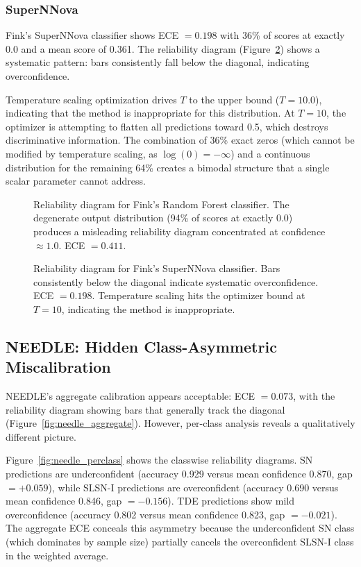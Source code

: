\documentclass[twocolumn]{aastex631}
\begin{document}
\subsubsection{SuperNNova}

Fink's SuperNNova classifier \citep{moller2020} shows ECE $= 0.198$ with 36\% of scores at exactly 0.0 and a mean score of 0.361. The reliability diagram (Figure~\ref{fig:fink_snn}) shows a systematic pattern: bars consistently fall below the diagonal, indicating overconfidence.

Temperature scaling optimization drives $T$ to the upper bound ($T = 10.0$), indicating that the method is inappropriate for this distribution. At $T = 10$, the optimizer is attempting to flatten all predictions toward 0.5, which destroys discriminative information. The combination of 36\% exact zeros (which cannot be modified by temperature scaling, as $\log(0) = -\infty$) and a continuous distribution for the remaining 64\% creates a bimodal structure that a single scalar parameter cannot address.

\begin{figure}
\caption{Reliability diagram for Fink's Random Forest classifier. The degenerate output distribution (94\% of scores at exactly 0.0) produces a misleading reliability diagram concentrated at confidence $\approx 1.0$. ECE $= 0.411$. \label{fig:fink_rf}}
\end{figure}

\begin{figure}
\caption{Reliability diagram for Fink's SuperNNova classifier. Bars consistently below the diagonal indicate systematic overconfidence. ECE $= 0.198$. Temperature scaling hits the optimizer bound at $T = 10$, indicating the method is inappropriate. \label{fig:fink_snn}}
\end{figure}


\subsection{NEEDLE: Hidden Class-Asymmetric Miscalibration} \label{sec:needle}

NEEDLE's aggregate calibration appears acceptable: ECE $= 0.073$, with the reliability diagram showing bars that generally track the diagonal (Figure~\ref{fig:needle_aggregate}). However, per-class analysis reveals a qualitatively different picture.

Figure~\ref{fig:needle_perclass} shows the classwise reliability diagrams. SN predictions are underconfident (accuracy 0.929 versus mean confidence 0.870, gap $= +0.059$), while SLSN-I predictions are overconfident (accuracy 0.690 versus mean confidence 0.846, gap $= -0.156$). TDE predictions show mild overconfidence (accuracy 0.802 versus mean confidence 0.823, gap $= -0.021$). The aggregate ECE conceals this asymmetry because the underconfident SN class (which dominates by sample size) partially cancels the overconfident SLSN-I class in the weighted average.
\end{document}

